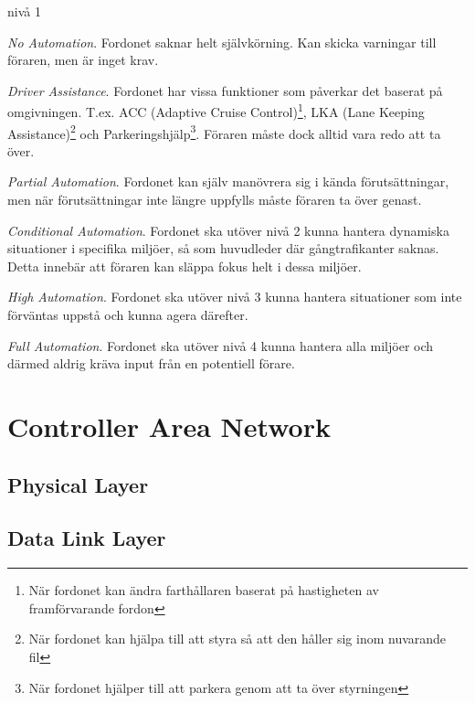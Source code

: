 \documentclass[a4paper]{IEEEtran}
\begin{document}
\vspace{10 pt}
\begin{labeling}{nivå 1}
	\item [\textbf{nivå 0}] \emph{No Automation}. Fordonet saknar helt självkörning. Kan skicka varningar till föraren, men är inget krav.
	\item [\textbf{nivå 1}] \emph{Driver Assistance}. Fordonet har vissa funktioner som påverkar det baserat på omgivningen. T.ex. ACC (Adaptive Cruise Control)\footnote{När fordonet kan ändra farthållaren baserat på hastigheten av framförvarande fordon\cite{ACC}}, LKA (Lane Keeping Assistance)\footnote{När fordonet kan hjälpa till att styra så att den håller sig inom nuvarande fil\cite{LKA}} och Parkeringshjälp\footnote{När fordonet hjälper till att parkera genom att ta över styrningen\cite{AP}}. Föraren måste dock alltid vara redo att ta över.
	\item [\textbf{nivå 2}] \emph{Partial Automation}. Fordonet kan själv manövrera sig i kända förutsättningar, men när förutsättningar inte längre uppfylls måste föraren ta över genast.
	\item [\textbf{nivå 3}] \emph{Conditional Automation}. Fordonet ska utöver nivå 2 kunna hantera dynamiska situationer i specifika miljöer, så som huvudleder där gångtrafikanter saknas. Detta innebär att föraren kan släppa fokus helt i dessa miljöer.  
	\item [\textbf{nivå 4}] \emph{High Automation}. Fordonet ska utöver nivå 3 kunna hantera situationer som inte förväntas uppstå och kunna agera därefter.
	\item [\textbf{nivå 5}] \emph{Full Automation}. Fordonet ska utöver nivå 4 kunna hantera alla miljöer och därmed aldrig kräva input från en potentiell förare.
\end{labeling}

\section{Controller Area Network}

\subsection{Physical Layer}

\subsection{Data Link Layer}
\end{document}
